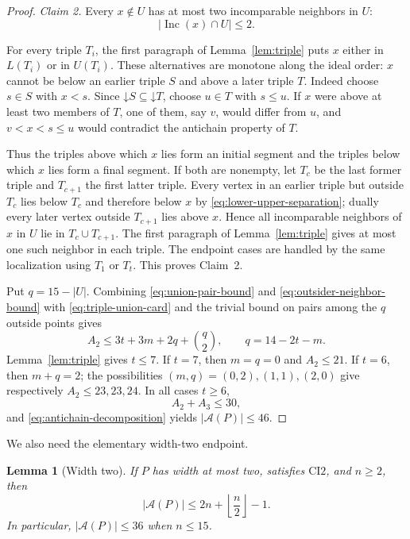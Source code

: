 \documentclass[11pt]{article}
\numberwithin{equation}{section}
\newtheorem{lemma}[theorem]{Lemma}
\theoremstyle{definition}
\theoremstyle{remark}
\newcommand{\Inc}{\operatorname{Inc}}
\newcommand{\down}{\mathord{\downarrow}}
\newcommand{\A}{\mathcal A}
\begin{document}
\begin{proof}
\emph{Claim 2.}  Every $x\notin U$ has at most two incomparable neighbors
in $U$:
\begin{equation}\label{eq:outsider-neighbor-bound}
|\Inc(x)\cap U|\le2.
\end{equation}

For every triple
$T_i$, the first paragraph of
Lemma~\ref{lem:triple} puts $x$ either in $L(T_i)$ or in $U(T_i)$.
These alternatives are monotone along the ideal order: $x$ cannot be below
an earlier triple $S$ and above a later triple $T$.  Indeed choose
$s\in S$ with $x<s$.  Since $\down S\subseteq\down T$, choose
$u\in T$ with $s\le u$.  If $x$ were above at least two members of $T$,
one of them, say $v$, would differ from $u$, and
$v<x<s\le u$ would contradict the antichain property of $T$.

Thus the triples above which $x$ lies form an initial segment and the
triples below which $x$ lies form a final segment.  If both are nonempty,
let $T_c$ be the last former triple and $T_{c+1}$ the first latter triple.
Every vertex in an earlier triple but outside $T_c$ lies below $T_c$ and
therefore below $x$ by \eqref{eq:lower-upper-separation}; dually every later vertex outside
$T_{c+1}$ lies above $x$.  Hence all incomparable neighbors of $x$ in
$U$ lie in $T_c\cup T_{c+1}$.  The first paragraph of
Lemma~\ref{lem:triple} gives at most one such neighbor in each triple.
The endpoint cases are handled by the same localization using $T_1$ or
$T_t$.  This proves Claim~2.

Put $q=15-|U|$.  Combining
\eqref{eq:union-pair-bound} and \eqref{eq:outsider-neighbor-bound} with
\eqref{eq:triple-union-card} and the trivial bound on pairs among the $q$
outside points gives
\begin{equation}\label{eq:pair-tradeoff}
A_2\le3t+3m+2q+\binom q2,
        \qquad
        q=14-2t-m.
\end{equation}
Lemma~\ref{lem:triple} gives $t\le7$.  If $t=7$, then $m=q=0$ and
$A_2\le21$.  If $t=6$, then $m+q=2$; the possibilities
$(m,q)=(0,2),(1,1),(2,0)$ give respectively
$A_2\le23,23,24$.  In all cases $t\ge6$,
\[
        A_2+A_3\le30,
\]
and \eqref{eq:antichain-decomposition} yields $|\A(P)|\le46$.
\end{proof}

We also need the elementary width-two endpoint.

\begin{lemma}[Width two]\label{lem:width2}
If $P$ has width at most two, satisfies $\mathrm{CI2}$, and $n\ge2$, then
\[
        |\A(P)|
        \le 2n+\left\lfloor\frac n2\right\rfloor-1.
\]
In particular, $|\A(P)|\le36$ when $n\le15$.
\end{lemma}
\end{document}
